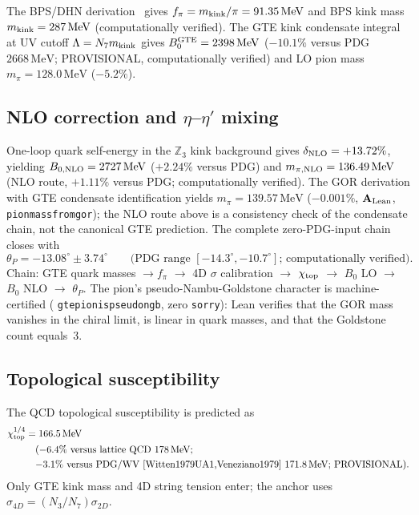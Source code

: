\documentclass[11pt]{article}
\theoremstyle{remark}
\newcommand{\Zthree}{\mathbb{Z}_3}
\newcommand{\lean}[1]{%
  \penalty-100
  \begingroup\def\_{\textunderscore\allowbreak}\texttt{#1}\endgroup}
\newcommand{\CatAL}{\ensuremath{\textbf{A}_{\rm Lean}}}
\begin{document}
The BPS/DHN derivation~\cite{DashenHasslacherNeveu1975} gives $f_\pi = m_{\rm kink}/\pi = 91.35\,\text{MeV}$ and
BPS kink mass $m_{\rm kink} = 287\,\text{MeV}$ (computationally verified).
The GTE kink condensate integral at UV cutoff $\Lambda = N_7 m_{\rm kink}$ gives
$B_0^{\rm GTE} = 2398\,\text{MeV}$ ($-10.1\%$ versus PDG $2668\,\text{MeV}$;
PROVISIONAL, computationally verified) and LO pion mass $m_\pi = 128.0\,\text{MeV}$ ($-5.2\%$).

\subsection{NLO correction and \texorpdfstring{$\eta$--$\eta'$}{eta-eta'} mixing}

One-loop quark self-energy in the $\Zthree$ kink background gives
$\delta_{\rm NLO} = +13.72\%$, yielding
$B_{0,\rm NLO} = 2727\,\text{MeV}$ ($+2.24\%$ versus PDG) and
$m_{\pi,\rm NLO} = 136.49\,\text{MeV}$ (NLO route, $+1.11\%$ versus PDG; computationally verified).
The GOR derivation with GTE condensate identification yields $m_\pi = 139.57\,\text{MeV}$ ($-0.001\%$, $\CatAL$, \lean{pion\_mass\_from\_gor}); the NLO route above is a consistency check of the condensate chain, not the canonical GTE prediction.
The complete zero-PDG-input chain closes with
\begin{equation}
  \theta_P = -13.08^\circ \pm 3.74^\circ
  \qquad \text{(PDG range $[-14.3^\circ, -10.7^\circ]$; computationally verified)}.
\end{equation}
Chain: GTE quark masses $\to f_\pi$ $\to$ 4D $\sigma$ calibration $\to$
$\chi_{\rm top}$ $\to$ $B_0$ LO $\to$ $B_0$ NLO $\to$ $\theta_P$.
The pion's pseudo-Nambu-Goldstone character is machine-certified
(\lean{gte\_pion\_is\_pseudo\_ngb}, zero \texttt{sorry}): Lean verifies that the
GOR mass vanishes in the chiral limit, is linear in quark masses, and
that the Goldstone count equals~3.

\subsection{Topological susceptibility}

The QCD topological susceptibility is predicted as
\begin{equation}
\begin{aligned}
  \chi_{\rm top}^{1/4} &= 166.5\,\text{MeV} \\
  &\quad \text{($-6.4\%$ versus lattice QCD $178\,\text{MeV}$;} \\
  &\quad \text{$-3.1\%$ versus PDG/WV~\cite{Witten1979UA1,Veneziano1979} $171.8\,\text{MeV}$; PROVISIONAL).}
\end{aligned}
\end{equation}
Only GTE kink mass and 4D string tension enter; the anchor uses
$\sigma_{4D} = (N_3/N_7)\sigma_{2D}$.
\end{document}
